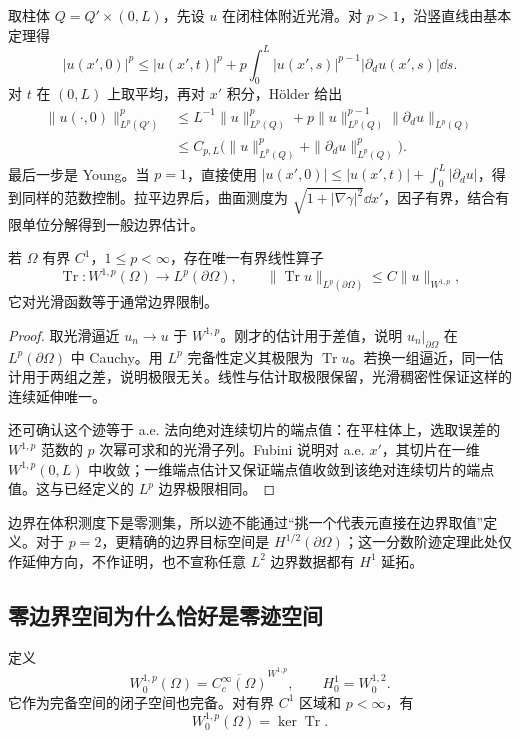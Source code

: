 取柱体 $Q=Q'\times(0,L)$，先设 $u$ 在闭柱体附近光滑。对 $p>1$，沿竖直线由基本定理得
\[
 |u(x',0)|^p
 \le |u(x',t)|^p+
 p\int_0^L|u(x',s)|^{p-1}|\partial_du(x',s)|\dd s.
\]
对 $t$ 在 $(0,L)$ 上取平均，再对 $x'$ 积分，H\"older 给出
\begin{align*}
 \|u(\cdot,0)\|_{L^p(Q')}^p
 &\le L^{-1}\|u\|_{L^p(Q)}^p
    +p\|u\|_{L^p(Q)}^{p-1}\|\partial_du\|_{L^p(Q)}\\
 &\le C_{p,L}\big(\|u\|_{L^p(Q)}^p+\|\partial_du\|_{L^p(Q)}^p\big).
\end{align*}
最后一步是 Young。当 $p=1$，直接使用
$|u(x',0)|\le|u(x',t)|+\int_0^L|\partial_du|$，得到同样的范数控制。拉平边界后，曲面测度为 $\sqrt{1+|\nabla\gamma|^2}\dd x'$，因子有界，结合有限单位分解得到一般边界估计。

\begin{theorem}[迹算子的构造]\label{thm:weak-trace}
若 $\Omega$ 有界 $C^1$，$1\le p<\infty$，存在唯一有界线性算子
\begin{equation}
 \operatorname{Tr}:W^{1,p}(\Omega)\to L^p(\partial\Omega),\qquad
 \|\operatorname{Tr}u\|_{L^p(\partial\Omega)}\le C\|u\|_{W^{1,p}},
 \label{eq:weak-trace-estimate}
\end{equation}
它对光滑函数等于通常边界限制。
\end{theorem}
\begin{proof}
取光滑逼近 $u_n\to u$ 于 $W^{1,p}$。刚才的估计用于差值，说明 $u_n|_{\partial\Omega}$ 在 $L^p(\partial\Omega)$ 中 Cauchy。用 $L^p$ 完备性定义其极限为 $\operatorname{Tr}u$。若换一组逼近，同一估计用于两组之差，说明极限无关。线性与估计取极限保留，光滑稠密性保证这样的连续延伸唯一。

还可确认这个迹等于 a.e. 法向绝对连续切片的端点值：在平柱体上，选取误差的 $W^{1,p}$ 范数的 $p$ 次幂可求和的光滑子列。Fubini 说明对 a.e. $x'$，其切片在一维 $W^{1,p}(0,L)$ 中收敛；一维端点估计又保证端点值收敛到该绝对连续切片的端点值。这与已经定义的 $L^p$ 边界极限相同。
\end{proof}
边界在体积测度下是零测集，所以迹不能通过“挑一个代表元直接在边界取值”定义。对于 $p=2$，更精确的边界目标空间是 $H^{1/2}(\partial\Omega)$；这一分数阶迹定理此处仅作延伸方向，不作证明，也不宣称任意 $L^2$ 边界数据都有 $H^1$ 延拓。

\subsection{零边界空间为什么恰好是零迹空间}

定义
\begin{equation}
 W^{1,p}_0(\Omega)=\overline{C_c^\infty(\Omega)}^{W^{1,p}},
 \qquad H^1_0=W^{1,2}_0.
 \label{eq:sobolev-zero}
\end{equation}
它作为完备空间的闭子空间也完备。对有界 $C^1$ 区域和 $p<\infty$，有
\begin{equation}
 \boxed{W^{1,p}_0(\Omega)=\ker\operatorname{Tr}.}
 \label{eq:weak-trace-kernel}
\end{equation}

